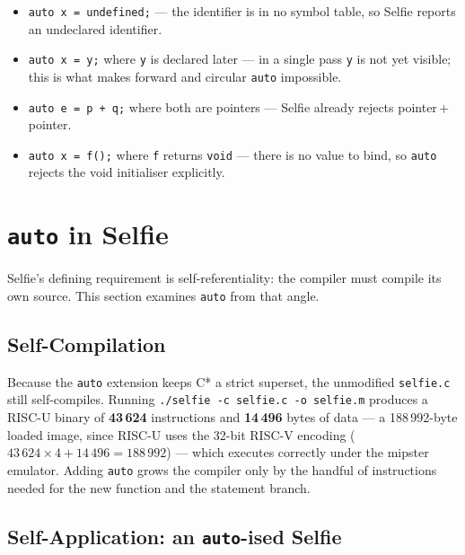 \documentclass[a4paper,11pt]{article}
\begin{document}
\begin{itemize}[leftmargin=2em]
  \item \texttt{auto x = undefined;} --- the identifier is in no symbol table, so Selfie reports an undeclared identifier.
  \item \texttt{auto x = y;} where \texttt{y} is declared later --- in a single pass \texttt{y} is not yet visible; this is what makes forward and circular \texttt{auto} impossible.
  \item \texttt{auto e = p + q;} where both are pointers --- Selfie already rejects pointer\,$+$\,pointer.
  \item \texttt{auto x = f();} where \texttt{f} returns \texttt{void} --- there is no value to bind, so \texttt{auto} rejects the void initialiser explicitly.
\end{itemize}

\section{\texttt{auto} in Selfie}
\label{sec:in-selfie}

Selfie's defining requirement is self-referentiality: the compiler must compile its own source. This section examines \texttt{auto} from that angle.

\subsection{Self-Compilation}
\label{sec:selfcompile}

Because the \texttt{auto} extension keeps C* a strict superset, the unmodified \texttt{selfie.c} still self-compiles. Running \texttt{./selfie -c selfie.c -o selfie.m} produces a RISC-U binary of \textbf{43\,624} instructions and \textbf{14\,496} bytes of data --- a 188\,992-byte loaded image, since RISC-U uses the 32-bit RISC-V encoding ($43\,624 \times 4 + 14\,496 = 188\,992$) --- which executes correctly under the mipster emulator. Adding \texttt{auto} grows the compiler only by the handful of instructions needed for the new function and the statement branch.

\subsection{Self-Application: an \texttt{auto}-ised Selfie}
\label{sec:dogfooding}
\end{document}
